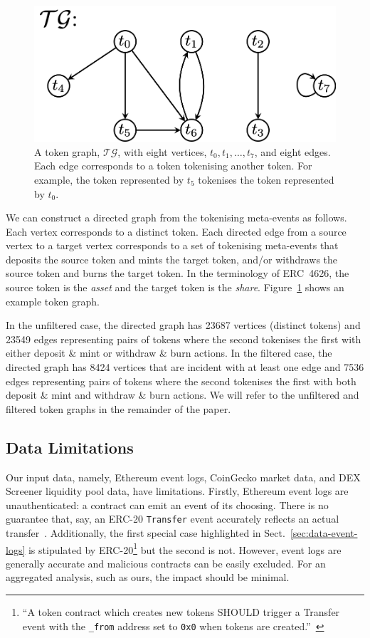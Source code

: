 \begin{figure}
  \centerline{\includegraphics[width=0.8\columnwidth]{img/token-graph/token-graph.png}}
  \caption{A token graph, $\mathcal{TG}$, with eight vertices, $t_0,
    t_1, \ldots, t_7$, and eight edges.  Each edge corresponds to a
    token tokenising another token.  For example, the token
    represented by $t_5$ tokenises the token represented by
    $t_0$.}\label{fig:token-graph}
\end{figure}

We can construct a directed graph from the tokenising meta-events as
follows.  Each vertex corresponds to a distinct token.  Each directed
edge from a source vertex to a target vertex corresponds to a set of
tokenising meta-events that deposits the source token and mints the
target token, and/or withdraws the source token and burns the target
token.  In the terminology of ERC~4626, the source token is the
\textit{asset} and the target token is the \textit{share}.
Figure~\ref{fig:token-graph} shows an example token graph.

In the unfiltered case, the directed graph has \num{23687} vertices
(distinct tokens) and \num{23549} edges representing pairs of tokens
where the second tokenises the first with either deposit \& mint or
withdraw \& burn actions.  In the filtered case, the directed graph
has \num{8424} vertices that are incident with at least one edge and
\num{7536} edges representing pairs of tokens where the second
tokenises the first with both deposit \& mint and withdraw \& burn
actions.  We will refer to the unfiltered and filtered token graphs in
the remainder of the paper.

\subsection{Data Limitations}\label{sec:data-limitations}

Our input data, namely, Ethereum event logs, CoinGecko market data,
and DEX Screener liquidity pool data, have limitations.  Firstly,
Ethereum event logs are unauthenticated: a contract can emit an event
of its choosing.  There is no guarantee that, say, an ERC-20
\texttt{Transfer} event accurately reflects an actual
transfer~\cite{guidi-michienzi-22}.  Additionally, the first special
case highlighted in Sect.~\ref{sec:data-event-logs} is stipulated by
ERC-20\footnote{``A token contract which creates new tokens SHOULD
trigger a Transfer event with the \texttt{\_from} address set to
\texttt{0x0} when tokens are
created.''~\cite{vogelsteller-buterin-15}} but the second is not.
However, event logs are generally accurate and malicious contracts can
be easily excluded.  For an aggregated analysis, such as ours, the
impact should be minimal.

